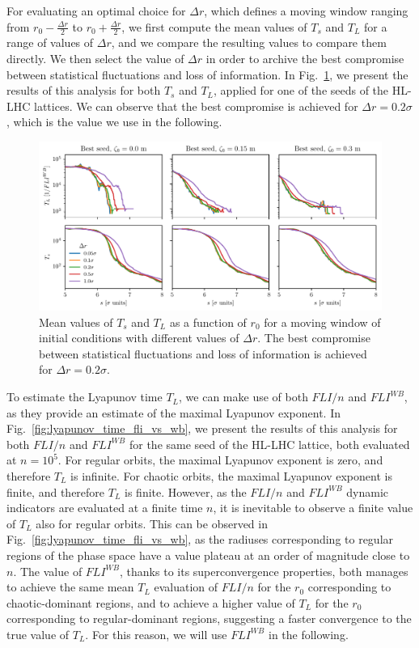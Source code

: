 For evaluating an optimal choice for $\Delta r$, which defines a moving window ranging from $r_0 - \frac{\Delta r}{2}$ to $r_0 + \frac{\Delta r}{2}$, we first compute the mean values of $T_s$ and $T_L$ for a range of values of $\Delta r$, and we compare the resulting values to compare them directly. We then select the value of $\Delta r$ in order to archive the best compromise between statistical fluctuations and loss of information. In Fig.~\ref{fig:ts_vs_r0}, we present the results of this analysis for both $T_s$ and $T_L$, applied for one of the seeds of the HL-LHC lattices. We can observe that the best compromise is achieved for $\Delta r = 0.2\sigma$, which is the value we use in the following.

\begin{figure}
    \centering
    \includegraphics[width=1\textwidth]{6_lhc_dynamic_indicators/figs/lyapunov_time_vs_thickness.pdf}
    \caption{Mean values of $T_s$ and $T_L$ as a function of $r_0$ for a moving window of initial conditions with different values of $\Delta r$. The best compromise between statistical fluctuations and loss of information is achieved for $\Delta r = 0.2\sigma$.}
    \label{fig:ts_vs_r0}
\end{figure}

To estimate the Lyapunov time $T_L$, we can make use of both $FLI/n$ and $FLI^{{WB}}$, as they provide an estimate of the maximal Lyapunov exponent. In Fig.~\ref{fig:lyapunov_time_fli_vs_wb}, we present the results of this analysis for both $FLI/n$ and $FLI^{{WB}}$ for the same seed of the HL-LHC lattice, both evaluated at $n=10^5$. For regular orbits, the maximal Lyapunov exponent is zero, and therefore $T_L$ is infinite. For chaotic orbits, the maximal Lyapunov exponent is finite, and therefore $T_L$ is finite. However, as the $FLI/n$ and $FLI^{WB}$ dynamic indicators are evaluated at a finite time $n$, it is inevitable to observe a finite value of $T_L$ also for regular orbits. This can be observed in Fig.~\ref{fig:lyapunov_time_fli_vs_wb}, as the radiuses corresponding to regular regions of the phase space have a value plateau at an order of magnitude close to $n$. The value of $FLI^{{WB}}$, thanks to its superconvergence properties, both manages to achieve the same mean $T_L$ evaluation of $FLI/n$ for the $r_0$ corresponding to chaotic-dominant regions, and to achieve a higher value of $T_L$ for the $r_0$ corresponding to regular-dominant regions, suggesting a faster convergence to the true value of $T_L$. For this reason, we will use $FLI^{{WB}}$ in the following.

